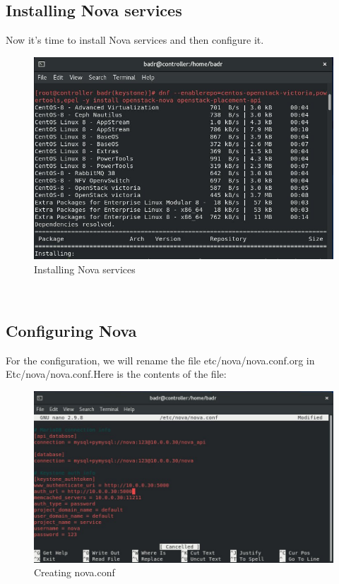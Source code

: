 \begin{spacing}{1.2}
\subsection{Installing Nova services}
\par 
Now it's time to install Nova services and then configure it. 
\\
\begin{figure}[!htb] 
\begin{center} 
\includegraphics[width=1\linewidth]{Cloud/Installing and Configuring Nova services/Installing Nova services} 
\end{center} 
\caption{Installing Nova services} 
\end{figure}  \FloatBarrier 
\\

\subsection{Configuring Nova}
\par 
For the configuration, we will rename the file etc/nova/nova.conf.org in
Etc/nova/nova.conf.\newline Here is the contents of the file: 
\\
\begin{figure}[!htb] 
\begin{center} 
\includegraphics[width=1\linewidth]{Cloud/Installing and Configuring Nova services/Creating nova.conf} 
\end{center} 
\caption{Creating nova.conf} 
\end{figure}  \FloatBarrier 
\\


\end{spacing}
